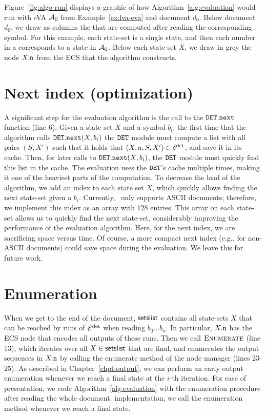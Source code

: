 \begin{example}
	Figure~\ref{fig:algo-run} displays a graphic of how
	Algorithm~\ref{alg:evaluation} would run with eVA $\mathcal{A}_0$ from
	Example~\ref{ex:lva-eva} and document $d_0$. Below document $d_0$, we draw
	as columns the \cstateslistss{} that are computed after reading the
	corresponding symbol. For this example, each state-set is a single state,
	and then each number in a \cstateslists{} corresponds to a state in $\mathcal{A}_0$.
	Below each state-set $X$, we draw in grey the node $X.\mathtt{n}$ from the ECS
	that the algorithm constructs.
\end{example}

\section{Next index (optimization)}
A significant step for the evaluation algorithm is the call to the
$\mathtt{DET}.\texttt{next}$ function (line 6). Given a state-set $X$ and a symbol
$b_i$, the first time that the algorithm calls $\mathtt{DET}.\texttt{next}(X, b_i)$ the
$\mathtt{DET}$ module must compute a list with all pairs $(S, X')$ such that it holds
that $(X,a,S,X') \in \delta^{\operatorname{det}}$, and save it in its cache. Then, for later
calls to  $\mathtt{DET}.\texttt{next}(X, b_i)$, the $\mathtt{DET}$ module must quickly find
this list in the cache. The evaluation uses the $\mathtt{DET}$'s cache multiple times,
making it  one of the heaviest parts of the computation. To decrease the load of
the algorithm, we add an index to each state set $X$, which quickly allows
finding the next state-set given a $b_i$. Currently, \rematch\ only supports
ASCII documents; therefore, we implement this index as an array with 128
entries. This array on each state-set allows us to quickly find the next
state-set, considerably improving the performance of the evaluation algorithm.
Here, for the next index, we are sacrificing space versus time. Of course, a
more compact next index (e.g., for non-ASCII documents) could save space during
the evaluation. We leave this for future work.

\section{Enumeration}
When we get to the end of the document, $\textsf{setslist}$ contains all state-sets
$X$ that can be reached by runs of $\mathcal{E}^{\operatorname{det}}$ when reading $b_0 \ldots b_n$. In
particular, $X.\mathtt{n}$ has the ECS node that encodes all outputs of these runs.
Then we call $\textproc{Enumerate}$ (line 13), which iterates over all $X \in
\textsf{setslist}$ that are final, and enumerates the output sequences in $X.\mathtt{n}$
by calling the enumerate method of the node manager (lines 23-25).
%
As described in Chapter~\ref{chpt:output}, we can perform an early output
enumeration whenever we reach a final state at the $i$-th iteration. For ease of
presentation, we code Algorithm~\ref{alg:evaluation} with the enumeration
procedure after reading the whole document. %
implementation, we call the enumeration method whenever we reach a final state.


